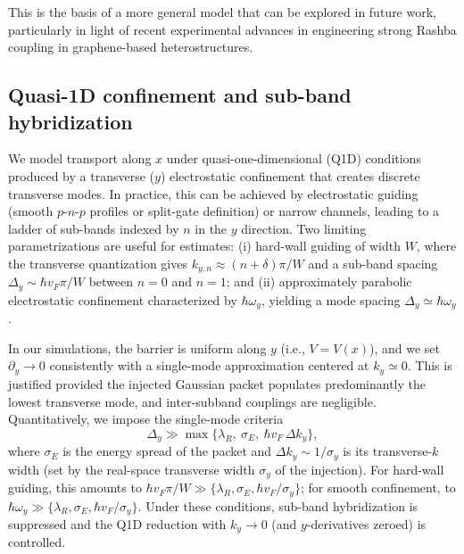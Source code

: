 This is the basis of a more general model that can be explored in future work, particularly in light of recent experimental advances in engineering strong Rashba coupling in graphene-based heterostructures\cite{ManchonNatureMater2015}.

\subsection{Quasi-1D confinement and sub-band hybridization}\label{subsec:q1d-confinement-hybridization}
We model transport along $x$ under quasi-one-dimensional (Q1D) conditions produced by a transverse ($y$) electrostatic confinement that creates discrete transverse modes.
In practice, this can be achieved by electrostatic guiding (smooth $p$-$n$-$p$ profiles or split-gate definition) or narrow channels, leading to a ladder of sub-bands indexed by $n$ in the $y$ direction\cite{Young2009, ParedesPhysRevB2021, TrauzettelNature2007}.
Two limiting parametrizations are useful for estimates:
(i) hard-wall guiding of width $W$, where the transverse quantization gives $k_{y,n}\approx (n+\delta)\pi/W$ and a sub-band spacing $\Delta_y\sim \hbar v_F\pi/W$ between $n=0$ and $n=1$; and
(ii) approximately parabolic electrostatic confinement characterized by $\hbar\omega_y$, yielding a mode spacing $\Delta_y\simeq \hbar\omega_y$.

In our simulations, the barrier is uniform along $y$ (i.e., $V=V(x)$), and we set $\partial_y\to 0$ consistently with a single-mode approximation centered at $k_y\simeq 0$.
This is justified provided the injected Gaussian packet populates predominantly the lowest transverse mode, and inter-subband couplings are negligible.
Quantitatively, we impose the single-mode criteria
\begin{equation*}
\Delta_y \gg \max\{\lambda_R,\ \sigma_E,\ \hbar v_F\,\Delta k_y\},
\end{equation*}
\noindent where $\sigma_E$ is the energy spread of the packet and $\Delta k_y\sim 1/\sigma_y$ is its transverse-$k$ width (set by the real-space transverse width $\sigma_y$ of the injection).
For hard-wall guiding, this amounts to $\hbar v_F\pi/W \gg \{\lambda_R,\sigma_E,\hbar v_F/\sigma_y\}$; for smooth confinement, to $\hbar\omega_y \gg \{\lambda_R,\sigma_E,\hbar v_F/\sigma_y\}$.
Under these conditions, sub-band hybridization is suppressed and the Q1D reduction with $k_y\to 0$ (and $y$-derivatives zeroed) is controlled.

